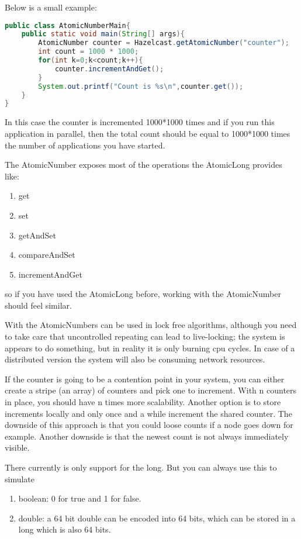 Below is a small example:
\begin{lstlisting}[language=java]
public class AtomicNumberMain{
    public static void main(String[] args){
        AtomicNumber counter = Hazelcast.getAtomicNumber("counter");
        int count = 1000 * 1000;
        for(int k=0;k<count;k++){
            counter.incrementAndGet();
        }
        System.out.printf("Count is %s\n",counter.get());
    }
}
\end{lstlisting}
In this case the counter is incremented 1000*1000 times and if you run this application in parallel, then the total count should be equal to 1000*1000 times the number of applications you have started.

The AtomicNumber exposes most of the operations the AtomicLong provides like:
\begin{enumerate}
\item get
\item set
\item getAndSet
\item compareAndSet
\item incrementAndGet
\end{enumerate}
so if you have used the AtomicLong before, working with the AtomicNumber should feel similar.

With the AtomicNumbers can be used in lock free algorithms, although you need to take care that uncontrolled repeating can lead to live-locking; the system is appears to do something, but in reality it is only burning cpu cycles. In case of a distributed version the system will also be consuming network resources. 

If the counter is going to be a contention point in your system, you can either create a stripe (an array) of counters and pick one to increment. With n counters in place, you should have n times more scalability. Another option is to store increments locally and only once and a while increment the shared counter. The downside of this approach is that you could loose counts if a node goes down for example. Another downside is that the newest count is not always immediately visible. 

There currently is only support for the long. But you can always use this to simulate
\begin{enumerate}
\item boolean: 0 for true and 1 for false.
\item double: a 64 bit double can be encoded into 64 bits, which can be stored in a long 
      which is also 64 bits.
\end{enumerate}


